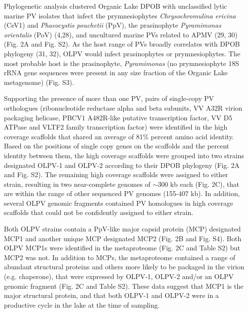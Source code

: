 Phylogenetic analysis clustered Organic Lake DPOB with unclassified lytic marine PV isolates that infect the prymnesiophytes \emph{Chrysochromulina ericina} (CeV1) and \emph{Phaeocystis pouchetii} (PpV),
 the prasinophyte \emph{Pyramimonas orientalis} (PoV) (4,28), and uncultured marine PVs related to APMV (29, 30) (Fig. 2A and Fig. S2). 
As the host range of PVs broadly correlates with DPOB phylogeny (31, 32), OLPV would infect prasinophytes or prymnesiophytes. 
The most probable host is the prasinophyte, \emph{Pyramimonas} (no prymnesiophyte 18S rRNA gene sequences were present in any size fraction of the Organic Lake metagenome) (Fig. S3).

Supporting the presence of more than one PV, pairs of single-copy PV orthologues 
(ribonucleotide reductase alpha and beta subunits, VV A32R virion packaging helicase, PBCV1 A482R-like putative transcription factor, VV D5 ATPase and VLTF2 family transcription factor) 
were identified in the high coverage scaffolds that shared an average of 81\% percent amino acid identity.
 Based on the positions of single copy genes on the scaffolds and the percent identity between them, the high coverage scaffolds were grouped into two strains designated OLPV-1 and OLPV-2 according to their DPOB phylogeny (Fig. 2A and Fig. S2).
 The remaining high coverage scaffolds were assigned to either strain, resulting in two near-complete genomes of $\sim$300 kb each (Fig. 2C), 
that are within the range of other sequenced PV genomes (155-407 kb). 
In addition, several OLPV genomic fragments contained PV homologues in high coverage scaffolds that could not be confidently assigned to either strain. 

Both OLPV strains contain a PpV-like major capsid protein (MCP) designated MCP1 and another unique MCP designated MCP2 (Fig. 2B and Fig. S4). 
Both OLPV MCP1s were identified in the metaproteome (Fig. 2C and Table S2) but MCP2 was not. 
In addition to MCPs, the metaproteome contained a range of abundant structural proteins and others more likely to be packaged in the virion (e.g. chaperone), that were expressed by OLPV-1, OLPV-2 and/or an OLPV genomic fragment (Fig. 2C and Table S2). 
These data suggest that MCP1 is the major structural protein, and that both OLPV-1 and OLPV-2 were in a productive cycle in the lake at the time of sampling. 

